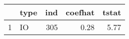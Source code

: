 % 
\begin{tabular}{rlrrr}
  \hline
 & type & ind & coefhat & tstat \\ 
  \hline
1 & IO & 305 & 0.28 & 5.77 \\ 
   \hline
\end{tabular}

